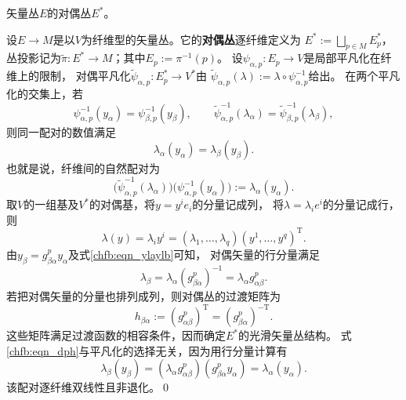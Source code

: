 \begin{example}
    矢量丛$E$的对偶丛$E^*$。
\end{example}
设$E\to M$是以$V$为纤维型的矢量丛。它的\textbf{对偶丛}逐纤维定义为
$E^*:=\bigsqcup_{p\in M}E_p^*$，丛投影记为$\tilde\pi:E^*\to M$；其中$E_p:=\pi^{-1}(p)$。
设$\psi_{\alpha,p}:E_p\to V$是局部平凡化在纤维上的限制，
对偶平凡化$\tilde\psi_{\alpha,p}:E_p^*\to V^*$由
$\tilde\psi_{\alpha,p}(\lambda):=\lambda\circ\psi_{\alpha,p}^{-1}$给出。
在两个平凡化的交集上，若
\begin{equation}
    \psi_{\alpha,p}^{-1}(y_\alpha)=\psi_{\beta,p}^{-1}(y_\beta),\qquad
    \tilde\psi_{\alpha,p}^{-1}(\lambda_\alpha)=\tilde\psi_{\beta,p}^{-1}(\lambda_\beta),
\end{equation}
则同一配对的数值满足
\begin{equation}\label{chfb:eqn_ylaylb}
    \lambda_\alpha(y_\alpha)=\lambda_\beta(y_\beta).
\end{equation}
也就是说，纤维间的自然配对为
\begin{equation}\label{chfb:eqn_dph}
    \bigl(\tilde\psi_{\alpha,p}^{-1}(\lambda_\alpha)\bigr)
    \bigl(\psi_{\alpha,p}^{-1}(y_\alpha)\bigr):=\lambda_\alpha(y_\alpha).
\end{equation}
取$V$的一组基及$V^*$的对偶基，将$y=y^i e_i$的分量记成列，
将$\lambda=\lambda_i e^i$的分量记成行，则
\[
    \lambda(y)=\lambda_i y^i=(\lambda_1,\ldots,\lambda_q)(y^1,\ldots,y^q)^{\mathrm{T}}.
\]
由$y_\beta=g_{\beta\alpha}^p y_\alpha$及式\eqref{chfb:eqn_ylaylb}可知，
对偶矢量的行分量满足
\[
    \lambda_\beta=\lambda_\alpha(g_{\beta\alpha}^p)^{-1}
    =\lambda_\alpha g_{\alpha\beta}^p.
\]
若把对偶矢量的分量也排列成列，则对偶丛的过渡矩阵为
\[
    h_{\beta\alpha}:=(g_{\alpha\beta}^p)^{\mathrm{T}}=(g_{\beta\alpha}^p)^{-\mathrm{T}}.
\]
这些矩阵满足过渡函数的相容条件，因而确定$E^*$的光滑矢量丛结构。
式\eqref{chfb:eqn_dph}与平凡化的选择无关，因为用行分量计算有
\[
    \lambda_\beta(y_\beta)
    =(\lambda_\alpha g_{\alpha\beta}^p)(g_{\beta\alpha}^p y_\alpha)
    =\lambda_\alpha(y_\alpha).
\]
该配对逐纤维双线性且非退化。\qed

